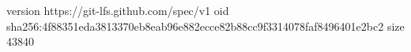 version https://git-lfs.github.com/spec/v1
oid sha256:4f88351eda3813370eb8eab96e882ecce82b88cc9f3314078faf8496401e2bc2
size 43840
